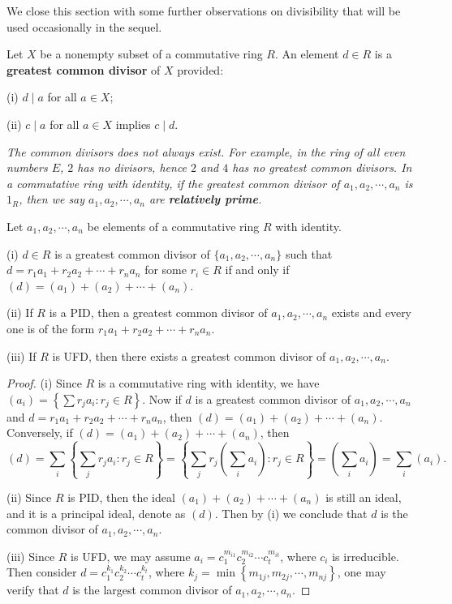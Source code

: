 We close this section with some further observations on divisibility that will be used occasionally in the sequel.
\begin{definition}
Let $X$ be a nonempty subset of a commutative ring $R$. An element $d\in R$ is a \textbf{greatest common divisor} of $X$ provided:\par
(i) $d\mid a$ for all $a\in X$;\par
(ii) $c\mid a$ for all $a\in X$ implies $c\mid d$.
\end{definition}
\begin{note}\em
The common divisors does not always exist. For example, in the ring of all even numbers $E$, $2$ has no divisors, hence $2$ and $4$ has no greatest common divisors. In a commutative ring with identity, if the greatest common divisor of $a_1,a_2,\cdots,a_n$ is $1_R$, then we say $a_1,a_2,\cdots,a_n$ are \textbf{relatively prime}.
\end{note}
\begin{theorem}
Let $a_1,a_2,\cdots,a_n$ be elements of a commutative ring $R$ with identity.\par
(i) $d\in R$ is a greatest common divisor of $\{a_1,a_2,\cdots,a_n\}$ such that $d=r_1a_1+r_2a_2+\cdots+r_na_n$ for some $r_i\in R$ if and only if $(d)=(a_1)+(a_2)+\cdots+(a_n)$.\par
(ii) If $R$ is a PID, then a greatest common divisor of $a_1,a_2,\cdots,a_n$ exists and every one is of the form $r_1a_1+r_2a_2+\cdots+r_na_n$.\par
(iii) If $R$ is UFD, then there exists a greatest common divisor of $a_1,a_2,\cdots,a_n$.
\end{theorem}
\begin{proof}
(i) Since $R$ is a commutative ring with identity, we have $\left( a_i \right) =\left\{ \sum{r_ja_i}:r_j\in R \right\} $. Now if $d$ is a greatest common divisor of $a_1,a_2,\cdots,a_n$ and $d=r_1a_1+r_2a_2+\cdots+r_na_n$, then $(d)=(a_1)+(a_2)+\cdots+(a_n)$. Conversely, if $(d)=(a_1)+(a_2)+\cdots+(a_n)$, then 
$$
\left( d \right) =\sum_i{\left\{ \sum_j{r_ja_i}:r_j\in R \right\}}=\left\{ \sum_j{r_j\left( \sum_i{a_i} \right)}:r_j\in R \right\} =\left( \sum_i{a_i} \right) =\sum_i{\left( a_i \right)}.
$$\par
(ii) Since $R$ is PID, then the ideal $(a_1)+(a_2)+\cdots+(a_n)$ is still an ideal, and it is a principal ideal, denote as $(d)$. Then by (i) we conclude that $d$ is the common divisor of $a_1,a_2,\cdots,a_n$.\par
(iii) Since $R$ is UFD, we may assume $a_i=c_{1}^{m_{i1}}c_{2}^{m_{i2}}\cdots c_{t}^{m_{it}}$, where $c_i$ is irreducible. Then consider $d=c_{1}^{k_1}c_{2}^{k_2}\cdots c_{t}^{k_t}$, where $k_j=\min \left\{ m_{1j},m_{2j},\cdots ,m_{nj} \right\} $, one may verify that $d$ is the largest common divisor of $a_1,a_2,\cdots,a_n$.
\end{proof}
